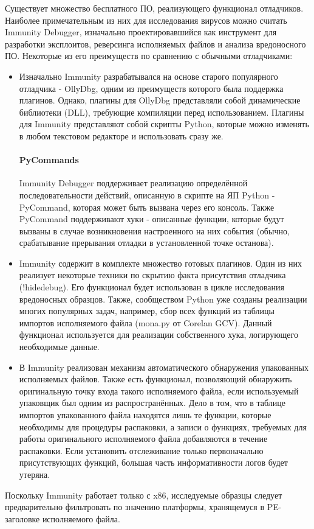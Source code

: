 Существует множество бесплатного ПО, реализующего функционал отладчиков. Наиболее примечательным из них для исследования вирусов можно считать Immunity Debugger, изначально проектировавшийся как инструмент для разработки эксплоитов, реверсинга исполняемых файлов и анализа вредоносного ПО. Некоторые из его преимуществ по сравнению с обычными отладчиками:
\begin {itemize}
	\item Изначально Immunity разрабатывался на основе старого популярного отладчика - OllyDbg, одним из преимуществ которого была поддержка плагинов. Однако, плагины для OllyDbg представляли собой динамические библиотеки (DLL), требующие компиляции перед использованием. Плагины для Immunity представляют собой скрипты Python, которые можно изменять в любом текстовом редакторе и использовать сразу же.
	\paragraph {PyCommands}
Immunity Debugger поддерживает реализацию определённой последовательности действий, описанную в скрипте на ЯП Python - PyCommand, которая может быть вызвана через его консоль. Также PyCommand поддерживают хуки - описанные функции, которые будут вызваны в случае возникновения настроенного на них события (обычно, срабатывание прерывания отладки в установленной точке останова).
	\item Immunity содержит в комплекте множество готовых плагинов. Один из них реализует некоторые техники по скрытию факта присутствия отладчика (!hidedebug). Его функционал будет использован в цикле исследования вредоносных образцов. Также, сообществом Python уже созданы реализации многих популярных задач, например, сбор всех функций из таблицы импортов исполняемого файла (mona.py от Corelan GCV). Данный функционал используется для реализации собственного хука, логирующего необходимые данные.
	\item В Immunity реализован механизм автоматического обнаружения упакованных исполняемых файлов. Также есть функционал, позволяющий обнаружить оригинальную точку входа такого исполняемого файла, если используемый упаковщик был одним из распространённых. Дело в том, что в таблице импортов упакованного файла находятся лишь те функции, которые необходимы для процедуры распаковки, а записи о функциях, требуемых для работы оригинального исполняемого файла добавляются в течение распаковки. Если установить отслеживание только первоначально присутствующих функций, большая часть информативности логов будет утеряна.
\end {itemize}
Поскольку Immunity работает только с x86, исследуемые образцы следует предварительно фильтровать по значению платформы, хранящемуся в PE-заголовке исполняемого файла.
